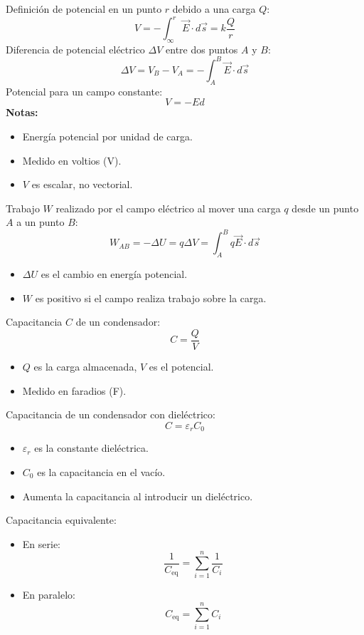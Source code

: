 \begin{tcolorbox}[title=Potencial Eléctrico]
  Definición de potencial en un punto \(r\) debido a una carga \(Q\):
  \[
    V = -\int_{\infty}^{r} \vec{E} \cdot d\vec{s} = k \frac{Q}{r}
  \]
  Diferencia de potencial eléctrico \(\Delta V\) entre dos puntos \(A\) y \(B\):
  \[
    \Delta V = V_B - V_A = -\int_{A}^{B} \vec{E} \cdot d\vec{s}
  \]
  Potencial para un campo constante:
  \[
    V = -Ed
  \]
  \textbf{Notas:}
  \begin{itemize}
    \item Energía potencial por unidad de carga.
    \item Medido en voltios (V).
    \item \(V\) es escalar, no vectorial.
  \end{itemize}
\end{tcolorbox}

\begin{tcolorbox}[title=Trabajo Eléctrico]
  Trabajo \(W\) realizado por el campo eléctrico al mover una carga \(q\) desde un punto \(A\) a un punto \(B\):
  \[
    W_{AB} = -\Delta U = q \Delta V = \int_{A}^{B} q\vec{E} \cdot d\vec{s}
  \]
  \begin{itemize}
    \item \(\Delta U\) es el cambio en energía potencial.
    \item \(W\) es positivo si el campo realiza trabajo sobre la carga.
  \end{itemize}
\end{tcolorbox}

\begin{tcolorbox}[title=Capacitancia]
  Capacitancia \(C\) de un condensador:
  \[
    C = \frac{Q}{V}
  \]
  \begin{itemize}
    \item \(Q\) es la carga almacenada, \(V\) es el potencial.
    \item Medido en faradios (F).
  \end{itemize}
  Capacitancia de un condensador con dieléctrico:
  \[
    C = \varepsilon_r C_0
  \]
  \begin{itemize}
    \item \(\varepsilon_r\) es la constante dieléctrica.
    \item \(C_0\) es la capacitancia en el vacío.
    \item Aumenta la capacitancia al introducir un dieléctrico.
  \end{itemize}
  Capacitancia equivalente:
  \begin{itemize}
    \item En serie:
      \[
        \frac{1}{C_{\text{eq}}} = \sum_{i=1}^{n} \frac{1}{C_i}
      \]
    \item En paralelo:
      \[
        C_{\text{eq}} = \sum_{i=1}^{n} C_i
      \]
  \end{itemize}
\end{tcolorbox}

\newpage